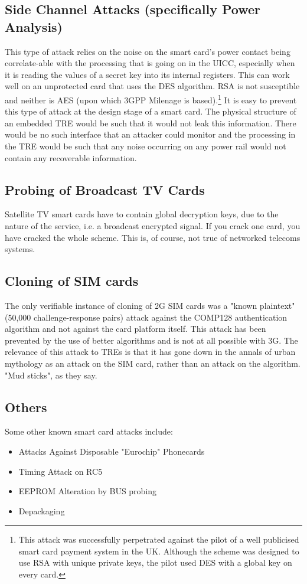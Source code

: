 \documentclass[12pt]{article}
\begin{document}
\subsection{Side Channel Attacks (specifically Power Analysis)}
This type of attack relies on the noise on the smart card’s power contact being correlate-able with the processing that is going on in the UICC, especially when it is reading the values of a secret key into its internal registers. This can work well on an unprotected card that uses the DES algorithm. RSA is not susceptible and neither is AES (upon which 3GPP Milenage is based).\footnote{This attack was successfully perpetrated against the pilot of a well publicised smart card payment system in the UK. Although the scheme was designed to use RSA with unique private keys, the pilot used DES with a global key on every card.} It is easy to prevent this type of attack at the design stage of a smart card. The physical structure of an embedded TRE would be such that it would not leak this information. There would be no such interface that an attacker could monitor and the processing in the TRE would be such that any noise occurring on any power rail would not contain any recoverable information.
\subsection{Probing of Broadcast TV Cards}
Satellite TV smart cards have to contain global decryption keys, due to the nature of the service, i.e. a broadcast encrypted signal. If you crack one card, you have cracked the whole scheme. This is, of course, not true of networked telecoms systems.

\subsection{Cloning of SIM cards}
The only verifiable instance of cloning of 2G SIM cards was a "known plaintext" (50,000 challenge-response pairs) attack against the COMP128 authentication algorithm and not against the card platform itself. This attack has been prevented by the use of better algorithms and is not at all possible with 3G. The relevance of this attack to TREs is that it has gone down in the annals of urban mythology as an attack on the SIM card, rather than an attack on the algorithm. "Mud sticks", as they say.
\subsection{Others}
Some other known smart card attacks include:
\begin{itemize}
\item Attacks Against Disposable "Eurochip" Phonecards
\item Timing Attack on RC5 \cite{timing_attack}
\item EEPROM Alteration by BUS probing \cite{probing_attack}
\item Depackaging \cite{probing_attack}
\end{itemize}
\end{document}
